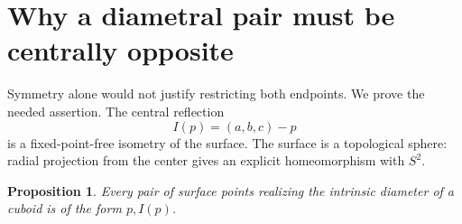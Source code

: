 \documentclass[11pt]{article}
\newtheorem{proposition}[theorem]{Proposition}
\theoremstyle{definition}
\begin{document}
\section{Why a diametral pair must be centrally opposite}
\label{sec:antipodal}

Symmetry alone would not justify restricting both endpoints. We prove
the needed assertion. The central reflection
\[
I(p)=(a,b,c)-p
\]
is a fixed-point-free isometry of the surface. The surface is a
topological sphere: radial projection from the center gives an explicit
homeomorphism with \(S^2\).

\begin{proposition}\label{prop:all-antipodal}
Every pair of surface points realizing the intrinsic diameter of a
cuboid is of the form \(p,I(p)\).
\end{proposition}
\end{document}
